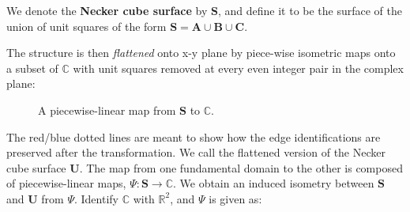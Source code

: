 \documentclass[]{article}
\begin{document}
\begin{Def} We denote the \textbf{Necker cube surface} by $\mathbf{S}$, and define it to be the surface of the union of unit squares of the form $\mathbf{S} = \mathbf{A}\cup\mathbf{B}\cup\mathbf{C}$.\end{Def}

The structure is then \emph{flattened} onto x-y plane by piece-wise isometric maps onto a subset of $\mathbb C$ with unit squares removed at every even integer pair in the complex plane: 

\begin{figure}[H]
\centering
 \hspace{0.1in}\raisebox{1.0in}{\text{$\rightarrow$}}\hspace{0.1in}
\raisebox{0.4in}{}
\caption{A piecewise-linear map from $\mathbf{S}$ to $\mathbb{C}$. }
\label{fig:Psi}
\end{figure}
\noindent The red/blue dotted lines are meant to show how the edge identifications are preserved after the transformation. We call the flattened version of the Necker cube surface $\mathbf U$. The map from one fundamental domain to the other is composed of piecewise-linear maps, $\Psi:\mathbf{S}\rightarrow\mathbb{C}$. We obtain an induced isometry between $\mathbf{S}$ and $\mathbf{U}$ from $\Psi$. Identify $\mathbb{C}$ with $\mathbb{R}^2$, and $\Psi$ is given as: 
\end{document}
